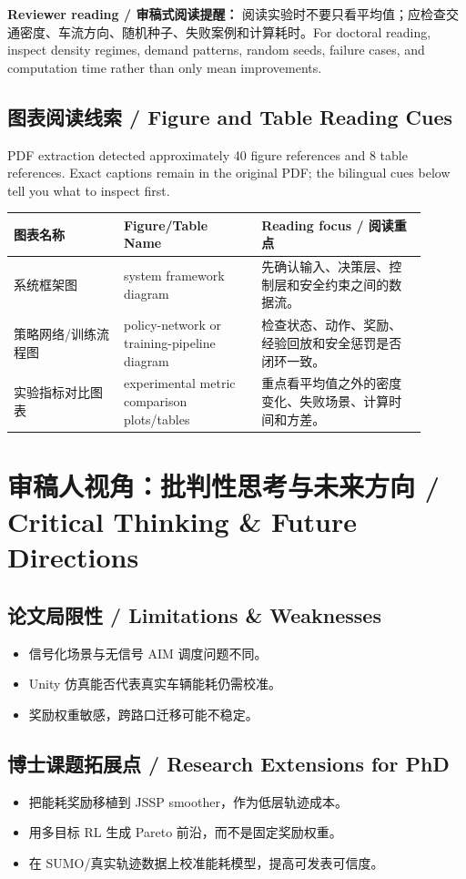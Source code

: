 \documentclass[UTF8,a4paper,11pt,fontset=fandol]{ctexart}
\begin{document}
\textbf{Reviewer reading / 审稿式阅读提醒：} 阅读实验时不要只看平均值；应检查交通密度、车流方向、随机种子、失败案例和计算耗时。For doctoral reading, inspect density regimes, demand patterns, random seeds, failure cases, and computation time rather than only mean improvements.

\subsection{图表阅读线索 / Figure and Table Reading Cues}
PDF extraction detected approximately 40 figure references and 8 table references. Exact captions remain in the original PDF; the bilingual cues below tell you what to inspect first.

\begin{longtable}{p{0.24\linewidth}p{0.30\linewidth}p{0.36\linewidth}}
\toprule
图表名称 & Figure/Table Name & Reading focus / 阅读重点\\
\midrule
系统框架图 & system framework diagram & 先确认输入、决策层、控制层和安全约束之间的数据流。 \\
策略网络/训练流程图 & policy-network or training-pipeline diagram & 检查状态、动作、奖励、经验回放和安全惩罚是否闭环一致。 \\
实验指标对比图表 & experimental metric comparison plots/tables & 重点看平均值之外的密度变化、失败场景、计算时间和方差。 \\
\bottomrule
\end{longtable}

\section{审稿人视角：批判性思考与未来方向 / Critical Thinking \& Future Directions}
\subsection{论文局限性 / Limitations \& Weaknesses}
\begin{itemize}
\item 信号化场景与无信号 AIM 调度问题不同。
\item Unity 仿真能否代表真实车辆能耗仍需校准。
\item 奖励权重敏感，跨路口迁移可能不稳定。
\end{itemize}


\subsection{博士课题拓展点 / Research Extensions for PhD}
\begin{itemize}
\item 把能耗奖励移植到 JSSP smoother，作为低层轨迹成本。
\item 用多目标 RL 生成 Pareto 前沿，而不是固定奖励权重。
\item 在 SUMO/真实轨迹数据上校准能耗模型，提高可发表可信度。
\end{itemize}
\end{document}
